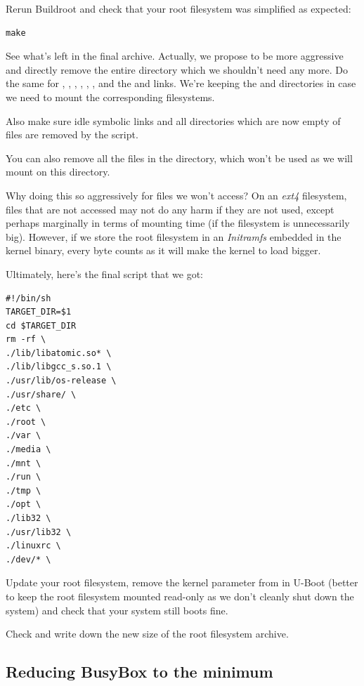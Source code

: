 Rerun Buildroot and check that your root filesystem was simplified as
expected:

\begin{verbatim}
make
\end{verbatim}

See what's left in the final archive. Actually, we propose to be more
aggressive and directly remove the entire  directory which we
shouldn't need any more. Do the same for , ,
, , , ,  and
the  and  links. We're keeping the 
and  directories in case we need to mount the corresponding
filesystems.

Also make sure idle symbolic links and all directories which are now
empty of files are removed by the script.

You can also remove all the files in the  directory,
which won't be used as we will mount  on this directory.

Why doing this so aggressively for files we won't access? On an {\em
ext4} filesystem, files that are not accessed may not do any harm if
they are not used, except perhaps marginally in terms of mounting time
(if the filesystem is unnecessarily big). However, if we store the root
filesystem in an {\em Initramfs} embedded in the kernel binary,
every byte counts as it will make the kernel to load bigger.

Ultimately, here's the final script that we got:
\begin{verbatim}
#!/bin/sh
TARGET_DIR=$1
cd $TARGET_DIR
rm -rf \
./lib/libatomic.so* \
./lib/libgcc_s.so.1 \
./usr/lib/os-release \
./usr/share/ \
./etc \
./root \
./var \
./media \
./mnt \
./run \
./tmp \
./opt \
./lib32 \
./usr/lib32 \
./linuxrc \
./dev/* \
\end{verbatim}

Update your root filesystem, remove the  kernel parameter from
\code{bootargs} in U-Boot (better to keep the root filesystem mounted read-only as we don't
cleanly shut down the system) and check that your system still boots fine.

Check and write down the new size of the root filesystem archive.

\subsection{Reducing BusyBox to the minimum}

